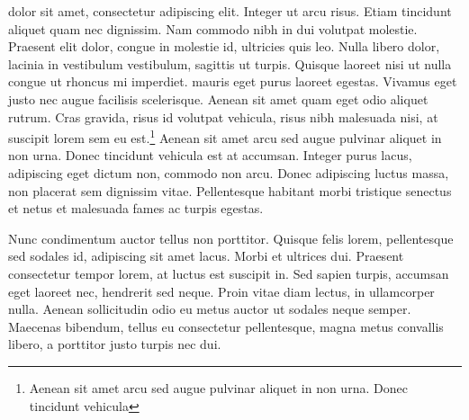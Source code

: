 
{}
 dolor sit amet, consectetur adipiscing elit.\citep{Nacuzzi:2007} Integer ut arcu risus. Etiam tincidunt aliquet quam nec dignissim. Nam commodo nibh in dui volutpat molestie. Praesent elit dolor, congue in molestie id, ultricies quis leo. Nulla libero dolor, lacinia in vestibulum vestibulum, sagittis ut turpis. Quisque laoreet nisi ut nulla congue ut rhoncus mi imperdiet.  mauris eget purus laoreet egestas.\citep{Cooper:1939} Vivamus eget justo nec augue facilisis scelerisque. Aenean sit amet quam eget odio aliquet rutrum. Cras gravida, risus id volutpat vehicula, risus nibh malesuada nisi, at suscipit lorem sem eu est.\footnote{Aenean sit amet arcu sed augue pulvinar aliquet in non urna. Donec tincidunt vehicula} Aenean sit amet arcu sed augue pulvinar aliquet in non urna. Donec tincidunt vehicula est at accumsan. Integer purus lacus, adipiscing eget dictum non, commodo non arcu. Donec adipiscing luctus massa, non placerat sem dignissim vitae. Pellentesque habitant morbi tristique senectus et netus et malesuada fames ac turpis egestas.\citep{Fernandez:1892,carlin2010linguistics}

\lbpsepline

Nunc condimentum auctor tellus non porttitor.\citep{Febre:2005,algonquina:wigwams:online} Quisque felis lorem, pellentesque sed sodales id, adipiscing sit amet lacus. Morbi et ultrices dui. Praesent consectetur tempor lorem, at luctus est suscipit in. Sed sapien turpis, accumsan eget laoreet nec, hendrerit sed neque. Proin vitae diam lectus, in ullamcorper nulla.\citep{Sultzman:1999} Aenean sollicitudin odio eu metus auctor ut sodales neque semper. Maecenas bibendum, tellus eu consectetur pellentesque, magna metus convallis libero, a porttitor justo turpis nec dui.\citep{Britannica:Tehuelche:Online,Guia:Patagonia}